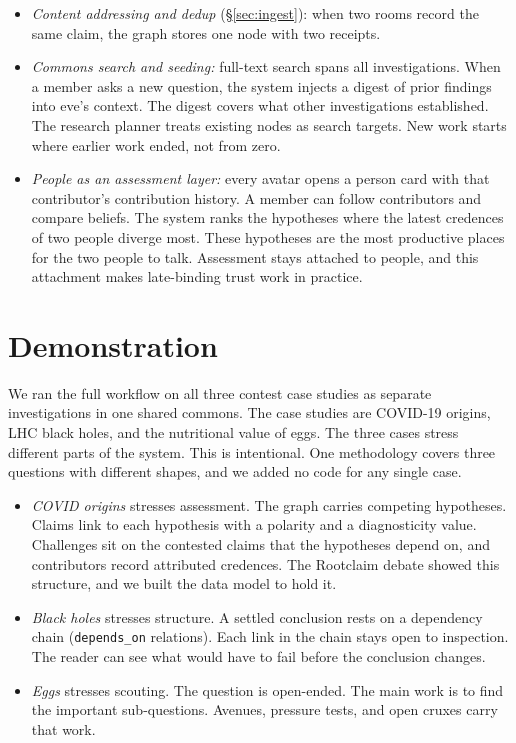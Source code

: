 \documentclass[10pt,twocolumn]{article}
\newcommand{\code}[1]{\texttt{\small #1}}
\begin{document}
\begin{itemize}
\item \emph{Content addressing and dedup} (\S\ref{sec:ingest}): when two
  rooms record the same claim, the graph stores one node with two
  receipts.
\item \emph{Commons search and seeding:} full-text search spans all
  investigations. When a member asks a new question, the system injects a
  digest of prior findings into eve's context. The digest covers what
  other investigations established. The research planner treats existing
  nodes as search targets. New work starts where earlier work ended, not
  from zero.
\item \emph{People as an assessment layer:} every avatar opens a person
  card with that contributor's contribution history. A member can follow
  contributors and compare beliefs. The system ranks the hypotheses where
  the latest credences of two people diverge most. These hypotheses are
  the most productive places for the two people to talk. Assessment stays
  attached to people, and this attachment makes late-binding trust work
  in practice.
\end{itemize}
\section{Demonstration}
\label{sec:demo}

We ran the full workflow on all three contest case studies as separate
investigations in one shared commons. The case studies are COVID-19
origins, LHC black holes, and the nutritional value of eggs. The three
cases stress different parts of the system. This is intentional. One
methodology covers three questions with different shapes, and we added no
code for any single case.

\begin{itemize}
\item \emph{COVID origins} stresses assessment. The graph carries
  competing hypotheses. Claims link to each hypothesis with a polarity and
  a diagnosticity value. Challenges sit on the contested claims that the
  hypotheses depend on, and contributors record attributed credences. The
  Rootclaim debate \cite{rootclaim} showed this structure, and we built
  the data model to hold it.
\item \emph{Black holes} stresses structure. A settled conclusion rests on
  a dependency chain (\code{depends\_on} relations). Each link in the
  chain stays open to inspection. The reader can see what would have to
  fail before the conclusion changes.
\item \emph{Eggs} stresses scouting. The question is open-ended. The main
  work is to find the important sub-questions. Avenues, pressure tests,
  and open cruxes carry that work.
\end{itemize}
\end{document}

